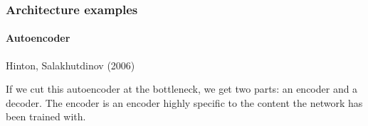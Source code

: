 \documentclass[9pt]{beamer}
\begin{document}



\begin{frame}
  \frametitle{Architecture examples}

  \framesubtitle{Autoencoder}

  \begin{center}
  \end{center}

  Hinton, Salakhutdinov (2006)

  \pause

  \bigskip

  If we cut this autoencoder at the bottleneck, we get two parts: an
  encoder and a decoder. The encoder is an encoder highly specific to
  the content the network has been trained with.
\end{frame}
\end{document}
